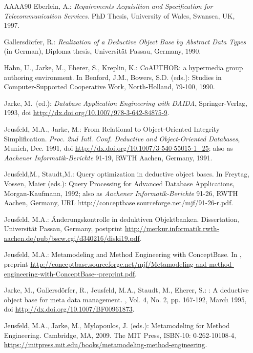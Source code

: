 \begin{thebibliography}{AAAA90}
 Eberlein, A.:
{\em  Requirements Acquisition and Specification for Telecommunication Services}.
PhD Thesis, University of Wales, Swansea, UK, 1997.


Gallersd\"orfer, R.:
{\em Realization of a Deductive Object Base by Abstract Data Types} (in German),
Diploma thesis, Universit\"at Passau, Germany, 1990.

 Hahn, U., Jarke, M., Eherer, S., Kreplin, K.:
CoAUTHOR: a hypermedia group authoring environment. In Benford, J.M.,
Bowers, S.D.  (eds.): Studies in Computer-Supported Cooperative Work,
North-Holland, 79-100, 1990.

Jarke, M.\ (ed.):
{\em Database Application Engineering with DAIDA},
Springer-Verlag, 1993,
doi \url{http://dx.doi.org/10.1007/978-3-642-84875-9}.


 Jeusfeld, M.A., Jarke, M.: From Relational to
Object-Oriented Integrity Simplification. {\it Proc. 2nd Intl. Conf.
Deductive and Object-Oriented Databases\/}, Munich, Dec. 1991,
doi \url{http://dx.doi.org/10.1007/3-540-55015-1_25}; also as
{\it Aachener Informatik-Berichte\/} 91-19, RWTH Aachen, Germany, 1991.

 Jeusfeld,M., Staudt,M.: Query optimization in deductive
object bases. In Freytag, Vossen, Maier (eds.): Query
Processing for Advanced Database Applications, Morgan-Kaufmann, 1992;
also as {\it Aachener Informatik-Berichte\/} 91-26, RWTH Aachen, Germany, URL
\url{http://conceptbase.sourceforge.net/mjf/91-26-r.pdf}.

 Jeusfeld, M.A.:
\"Anderungskontrolle in deduktiven Objektbanken.
Dissertation, Universit\"at Passau, Germany,
postprint \url{http://merkur.informatik.rwth-aachen.de/pub/bscw.cgi/d340216/diski19.pdf}.

 Jeusfeld, M.A.:
Metamodeling and Method Engineering with ConceptBase.
In \cite{jjm09},
preprint \url{http://conceptbase.sourceforge.net/mjf/Metamodeling-and-method-engineering-with-ConceptBase--preprint.pdf}.

Jarke, M., Gallersd\"orfer, R., Jeusfeld, M.A., Staudt, M., Eherer, S.:
: A deductive object base for meta data management.
, Vol. 4, No. 2, pp. 167-192,
  March 1995, doi
\url{http://dx.doi.org/10.1007/BF00961873}.

Jeusfeld, M.A., Jarke, M., Mylopoulos, J. (eds.):
Metamodeling for Method Engineering.
Cambridge, MA, 2009. The MIT Press, ISBN-10: 0-262-10108-4,
\url{https://mitpress.mit.edu/books/metamodeling-method-engineering}.



\end{thebibliography}
